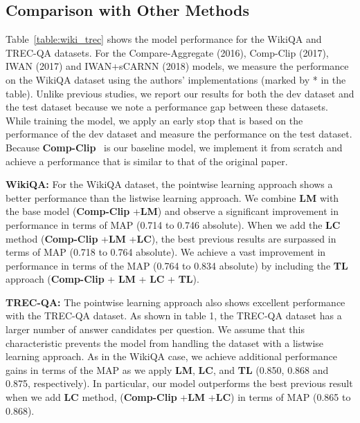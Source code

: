 \documentclass[sigconf]{acmart}
\begin{document}
\subsection{Comparison with Other Methods}
\label{ssec:comparison-with-other-methods}
Table~\ref{table:wiki_trec} shows the model performance for the WikiQA and TREC-QA datasets.
For the Compare-Aggregate (2016), Comp-Clip (2017), IWAN (2017) and IWAN+sCARNN (2018) models, we measure the performance on the WikiQA dataset using the authors' implementations (marked by * in the table).
Unlike previous studies, we report our results for both the dev dataset and the test dataset because we note a performance gap between these datasets. While training the model, we apply an early stop that is based on the performance of the dev dataset and measure the performance on the test dataset.
Because \textbf{Comp-Clip}~\cite{bian2017compare} is our baseline model, we implement it from scratch and achieve a performance that is similar to that of the original paper.


\vspace*{1mm}
\noindent\textbf{WikiQA: }
For the WikiQA dataset, the pointwise learning approach shows a better performance than the listwise learning approach.
We combine \textbf{LM} with the base model (\textbf{Comp-Clip} +\textbf{LM}) and observe a significant improvement in performance in terms of MAP (0.714 to 0.746 absolute). 
When we add the \textbf{LC} method (\textbf{Comp-Clip} +\textbf{LM} +\textbf{LC}), the best previous results are surpassed in terms of MAP (0.718 to 0.764 absolute). We achieve a vast improvement in performance in terms of the MAP (0.764 to 0.834 absolute) by including the \textbf{TL} approach (\textbf{Comp-Clip} + \textbf{LM} + \textbf{LC} + \textbf{TL}).


\vspace*{1mm}
\noindent\textbf{TREC-QA: }
The pointwise learning approach also shows excellent performance with the TREC-QA dataset.
As shown in table 1, the TREC-QA dataset has a larger number of answer candidates per question. We assume that this characteristic prevents the model from handling the dataset with a listwise learning approach.
As in the WikiQA case, we achieve additional performance gains in terms of the MAP as we apply \textbf{LM}, \textbf{LC}, and \textbf{TL} (0.850, 0.868 and 0.875, respectively).
In particular, our model outperforms the best previous result when we add \textbf{LC} method, (\textbf{Comp-Clip}
+\textbf{LM} +\textbf{LC}) in terms of MAP (0.865 to 0.868).
\end{document}
